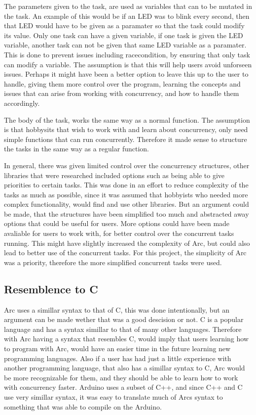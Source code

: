 The parameters given to the task, are used as variables that can to be mutated in the task. An example of this would be if an LED was to blink every second, then that LED would have to be given as a paramater so that the task could modify its value. Only one task can have a given variable, if one task is given the LED variable, another task can not be given that same LED variable as a paramater. This is done to prevent issues including racecondition, by ensuring that only task can modify a variable. The assumption is that this will help users avoid unforseen issues. Perhaps it might have been a better option to leave this up to the user to handle, giving them more control over the program, learning the concepts and issues that can arise from working with concurrency, and how to handle them accordingly.

The body of the task, works the same way as a normal function. The assumption is that hobbysits that wish to work with and learn about concurrency, only need simple functions that can run concurrently. Therefore it made sense to structure the tasks in the same way as a regular function.

In general, there was given limited control over the concurrency structures, other libraries that were researched included options such as being able to give priorities to certain tasks. This was done in an effort to reduce complexity of the tasks as much as possible, since it was assumed that hobbyists who needed more complex functionality, would find and use other libraries. But an argument could be made, that the structures have been simplified too much and abstracted away options that could be useful for users. More options could have been made avaliable for users to work with, for better control over the concurrent tasks running. This might have slightly increased the complexity of Arc, but could also lead to better use of the concurrent tasks. For this project, the simplicity of Arc was a priority, therefore the more simplified concurrent tasks were used.


\subsection{Resemblence to C}
Arc uses a simillar syntax to that of C, this was done intentionally, but an argument can be made wether that was a good descision or not. C is a popular language and has a syntax simillar to that of many other languages. Therefore with Arc having a syntax that resembles C, would imply that users learning how to program with Arc, would have an easier time in the future learning new programming languages. Also if a user has had just a little experience with another programming language, that also has a simillar syntax to C, Arc would be more recognizable for them, and they should be able to learn how to work with concurrency faster. Arduino uses a subset of C++, and since C++ and C use very simillar syntax, it was easy to translate much of Arcs syntax to something that was able to compile on the Arduino.

